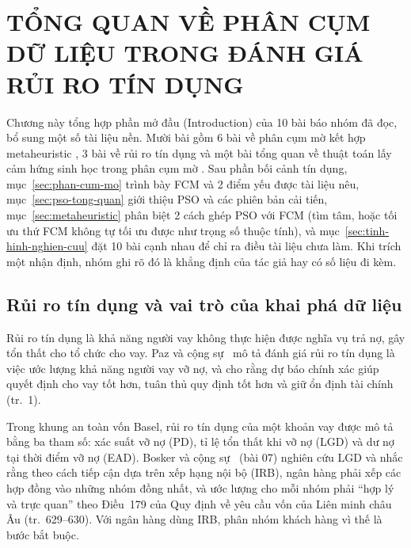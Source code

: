\chapter{TỔNG QUAN VỀ PHÂN CỤM DỮ LIỆU TRONG ĐÁNH GIÁ RỦI RO TÍN DỤNG}
\label{chap:tong-quan}

Chương này tổng hợp phần mở đầu (Introduction) của 10 bài báo nhóm đã đọc, bổ sung một số tài liệu nền. Mười bài gồm 6
bài về phân cụm mờ kết hợp metaheuristic
\cite{cui2022fpsoueba,qian2022psofcm,shang2021psokfcm,zhang2025qpsofcm,sun2024mstsofcm,liu2021msgwo}, 3 bài về rủi ro
tín dụng \cite{bosker2025clustered,vasheghani2025loan,lakra2025wcapso} và một bài tổng quan về thuật toán lấy cảm hứng
sinh học trong phân cụm mờ \cite{valdez2021bioinspired}. Sau phần bối cảnh tín dụng, mục~\ref{sec:phan-cum-mo} trình bày FCM
và 2 điểm yếu được tài liệu nêu, mục~\ref{sec:pso-tong-quan} giới thiệu PSO và các phiên bản cải tiến,
mục~\ref{sec:metaheuristic} phân biệt 2 cách ghép PSO với FCM (tìm tâm, hoặc tối ưu thứ FCM không tự tối ưu được như trọng
số thuộc tính), và mục~\ref{sec:tinh-hinh-nghien-cuu} đặt 10 bài cạnh nhau để chỉ ra điều tài liệu chưa làm. Khi trích
một nhận định, nhóm ghi rõ đó là khẳng định của tác giả hay có số liệu đi kèm.

\section{Rủi ro tín dụng và vai trò của khai phá dữ liệu}
\label{sec:rui-ro-tin-dung}
\label{sec:khai-pha-tin-dung}

Rủi ro tín dụng là khả năng người vay không thực hiện được nghĩa vụ trả nợ, gây tổn thất cho tổ chức cho vay. Paz và cộng
sự~\cite{paz2025creditreview} mô tả đánh giá rủi ro tín dụng là việc ước lượng khả năng người vay vỡ nợ, và cho rằng dự
báo chính xác giúp quyết định cho vay tốt hơn, tuân thủ quy định tốt hơn và giữ ổn định tài chính (tr.~1).

Trong khung an toàn vốn Basel, rủi ro tín dụng của một khoản vay được mô tả bằng ba tham số: xác suất vỡ nợ (PD), tỉ lệ
tổn thất khi vỡ nợ (LGD) và dư nợ tại thời điểm vỡ nợ (EAD). Bosker và cộng sự~\cite{bosker2025clustered} (bài 07) nghiên
cứu LGD và nhắc rằng theo cách tiếp cận dựa trên
xếp hạng nội bộ (IRB), ngân hàng phải xếp các hợp đồng vào những nhóm đồng nhất, và ước lượng cho mỗi nhóm phải ``hợp lý
và trực quan'' theo Điều~179 của Quy định về yêu cầu vốn của Liên minh châu Âu (tr.~629--630). Với ngân hàng dùng IRB,
phân nhóm khách hàng vì thế là bước bắt buộc.

